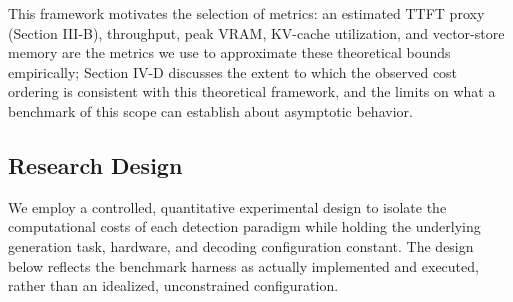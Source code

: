 \documentclass[conference]{IEEEtran}
\begin{document}
This framework motivates the selection of metrics: an estimated TTFT proxy (Section III-B), throughput, peak VRAM, KV-cache utilization, and vector-store memory are the metrics we use to approximate these theoretical bounds empirically; Section IV-D discusses the extent to which the observed cost ordering is consistent with this theoretical framework, and the limits on what a benchmark of this scope can establish about asymptotic behavior.

\subsection{Research Design}

We employ a controlled, quantitative experimental design to isolate the computational costs of each detection paradigm while holding the underlying generation task, hardware, and decoding configuration constant. The design below reflects the benchmark harness as actually implemented and executed, rather than an idealized, unconstrained configuration.
\end{document}
